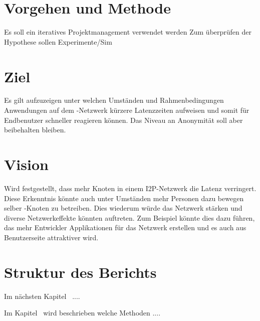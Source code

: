 \section{Vorgehen und Methode}


Es soll ein iteratives Projektmanagement verwendet werden
Zum überprüfen der Hypothese sollen Experimente/Sim

\section{Ziel}

Es gilt aufzuzeigen unter welchen Umständen und Rahmenbedingungen Anwendungen auf dem -Netzwerk kürzere Latenzzeiten aufweisen
und somit für Endbenutzer schneller reagieren können. Das Niveau an Anonymität soll aber beibehalten bleiben.


\section{Vision}

Wird festgestellt, dass mehr Knoten in einem I2P-Netzwerk die Latenz verringert.
Diese Erkenntnis könnte auch unter Umständen mehr Personen dazu bewegen selber -Knoten zu betreiben.
Dies wiederum würde das Netzwerk stärken und diverse Netzwerkeffekte könnten auftreten.
Zum Beispiel könnte dies dazu führen, das mehr Entwickler Applikationen für das Netzwerk erstellen und es auch aus Benutzerseite attraktiver wird.


\section{Struktur des Berichts}

Im nächsten Kapitel~ ....

Im Kapitel~ wird beschrieben welche Methoden .... 

